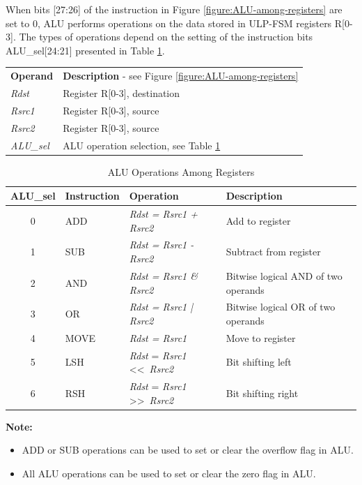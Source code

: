 \documentclass[main\_\_EN.tex]{subfiles}
\begin{document}
When bits [27:26] of the instruction in Figure \ref{figure:ALU-among-registers} are set to 0, ALU performs operations on the data stored in ULP-FSM registers R[0-3]. The types of operations depend on the setting of the instruction bits ALU\_sel[24:21] presented in Table \ref{table:ALU-among-registers}.

\begin{tabular}{ l l }
\textbf{Operand} & \textbf{Description} - see Figure \ref{figure:ALU-among-registers} \\
\textit{Rdst} & Register R[0-3], destination \\
\textit{Rsrc1} & Register R[0-3], source \\
\textit{Rsrc2} & Register R[0-3], source \\
\textit{ALU\_sel} & ALU operation selection, see Table \ref{table:ALU-among-registers}

\end{tabular}

\begin{table}[!ht ]
    \centering
    \begin{tabular}{ c l l l }
    \textbf{ALU\_sel} & \textbf{Instruction} & \textbf{Operation} & \textbf{Description} \\ \hline
    0  & ADD & \textit{ Rdst = Rsrc1 + Rsrc2 } & Add to register \\
    1  & SUB & \textit{ Rdst = Rsrc1 - Rsrc2 } & Subtract from register \\
    2  & AND & \textit{ Rdst = Rsrc1 \& Rsrc2 } & Bitwise logical AND of two operands  \\
    3  & OR & \textit{ Rdst = Rsrc1 | Rsrc2 } & Bitwise logical OR of two operands  \\
    4  & MOVE  & \textit{ Rdst = Rsrc1 } & Move to register  \\
    5 & LSH & \textit{Rdst} = \textit{Rsrc1} \textless\textless\ \textit{Rsrc2} & Bit shifting left \\
    6 & RSH & \textit{Rdst} = \textit{Rsrc1} \textgreater\textgreater\ \textit{Rsrc2} & Bit shifting right \\
    \end{tabular}
    \caption{ALU Operations Among Registers}
    \label{table:ALU-among-registers}
\end{table}

\textbf{Note:}
\begin{itemize}
    \item ADD or SUB operations can be used to set or clear the overflow flag in ALU.
    \item All ALU operations can be used to set or clear the zero flag in ALU.
\end{itemize}
\end{document}
